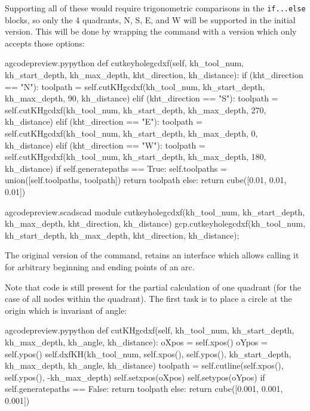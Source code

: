 \documentclass{ltxdoc}
\begin{document}
Supporting all of these would require trigonometric comparisons in the \verb|if...else| blocks, so only the 4 quadrants, N, S, E, and W will be supported in the initial version. This will be done by wrapping the command with a version which only accepts those options: 

\lstset{firstnumber=\thegcpy}
\begin{writecode}{a}{gcodepreview.py}{python}
    def cutkeyholegcdxf(self, kh_tool_num, kh_start_depth, kh_max_depth, kht_direction, kh_distance):   
        if (kht_direction == "N"): 
            toolpath = self.cutKHgcdxf(kh_tool_num, kh_start_depth, kh_max_depth, 90, kh_distance)
        elif (kht_direction == "S"):
            toolpath = self.cutKHgcdxf(kh_tool_num, kh_start_depth, kh_max_depth, 270, kh_distance)
        elif (kht_direction == "E"):
            toolpath = self.cutKHgcdxf(kh_tool_num, kh_start_depth, kh_max_depth, 0, kh_distance)
        elif (kht_direction == "W"):
            toolpath = self.cutKHgcdxf(kh_tool_num, kh_start_depth, kh_max_depth, 180, kh_distance)
        if self.generatepaths == True:
            self.toolpaths = union([self.toolpaths, toolpath])
            return toolpath
        else:
            return cube([0.01, 0.01, 0.01])

\end{writecode}
\addtocounter{gcpy}{15}

\lstset{firstnumber=\thegcpscad}
\begin{writecode}{a}{gcodepreview.scad}{scad}
module cutkeyholegcdxf(kh_tool_num, kh_start_depth, kh_max_depth, kht_direction, kh_distance){
    gcp.cutkeyholegcdxf(kh_tool_num, kh_start_depth, kh_max_depth, kht_direction, kh_distance);
}

\end{writecode}
\addtocounter{gcpscad}{4}

The original version of the command,  retains an interface which allows calling it for arbitrary beginning and ending points of an arc. 

Note that code is still present for the partial calculation of one quadrant (for the case of all nodes within the quadrant). The first task is to place a circle at the origin which is invariant of angle:
 
\lstset{firstnumber=\thegcpy}
\begin{writecode}{a}{gcodepreview.py}{python}
    def cutKHgcdxf(self, kh_tool_num, kh_start_depth, kh_max_depth, kh_angle, kh_distance):
        oXpos = self.xpos()
        oYpos = self.ypos()
        self.dxfKH(kh_tool_num, self.xpos(), self.ypos(), kh_start_depth, kh_max_depth, kh_angle, kh_distance)
        toolpath = self.cutline(self.xpos(), self.ypos(), -kh_max_depth)
        self.setxpos(oXpos)
        self.setypos(oYpos)
        if self.generatepaths == False:
            return toolpath
        else: 
            return cube([0.001, 0.001, 0.001])

\end{writecode}
\addtocounter{gcpy}{12}
\end{document}
